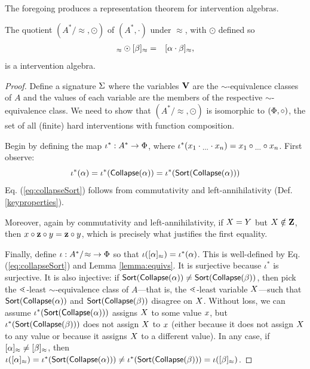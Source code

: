 \documentclass[twoside,11pt]{article}
\begin{document}
The foregoing produces a representation theorem for intervention algebras. 
\begin{theorem}
The quotient $(A^*/\!\approx, \odot)$ of $(A^*,\cdot)$ under $\approx$, 
 with $\odot$ defined so\begin{eqnarray*}
       [\seq]_{\approx} \odot [\seqq]_{\approx} & = & [\seq \cdot \seqq]_\approx,
   \end{eqnarray*} is a intervention algebra. \label{thm:rep}
\end{theorem}
\begin{proof}
Define a signature $\Sigma$ where the variables $\mathbf{V}$ are the $\sim$-equivalence classes of $A$ and the values of each variable are the members of the respective $\sim$-equivalence class. We need to show that $(A^*/\!\approx, \odot)$ is isomorphic to $(\Phi,\circ)$, the set of all (finite) hard interventions with function composition.

Begin by defining the map $\iota^*:A^* \rightarrow \Phi$, where $\iota^* (x_1\cdot {{ }_{\dots}} \cdot x_n) = x_1 \circ {{ }_{\dots}} \circ x_n$. First observe: 
\begin{equation}
    \label{eq:collapseSort}
\iota^*(\alpha) = \iota^*(\mathsf{Collapse}(\alpha)) = \iota^*(\mathsf{Sort}(\mathsf{Collapse}(\alpha)))
\end{equation} Eq. (\ref{eq:collapseSort}) follows from commutativity and left-annihilativity (Def. \ref{keyproperties}).

Moreover, again by commutativity and left-annihilativity, if $X=Y$ but $X \notin \mathbf{Z}$, then $x \circ \mathbf{z} \circ y = \mathbf{z} \circ y$, which is precisely what justifies the first equality. 

Finally, define $\iota:A^*/\! \approx\; \to \Phi$ so that $\iota([\alpha]_{\approx}) = \iota^*(\alpha)$. This is well-defined by Eq. (\ref{eq:collapseSort}) and Lemma \ref{lemma:equivs}. It is surjective because $\iota^*$ is surjective. It is also injective: if $\mathsf{Sort}(\mathsf{Collapse}(\alpha)) \neq \mathsf{Sort}(\mathsf{Collapse}(\beta))$, then pick the $\lessdot$-least $\sim$-equivalence class of $A$---that is, the $\lessdot$-least variable $X$---such that $\mathsf{Sort}(\mathsf{Collapse}(\alpha))$ and $\mathsf{Sort}(\mathsf{Collapse}(\beta))$ disagree on $X$. Without loss, we can assume $\iota^*(\mathsf{Sort}(\mathsf{Collapse}(\alpha)))$ assigns $X$ to some value $x$, but  $\iota^*(\mathsf{Sort}(\mathsf{Collapse}(\beta)))$ does not assign $X$ to $x$ (either because it does not assign $X$ to any value or because it assigns $X$ to a different value). In any case, if $[\alpha]_{\approx} \neq [\beta]_{\approx}$, then $\iota([\alpha]_{\approx}) = \iota^*(\mathsf{Sort}(\mathsf{Collapse}(\alpha)))\neq  \iota^*(\mathsf{Sort}(\mathsf{Collapse}(\beta))) = \iota([\beta]_{\approx})$. 



\end{proof}
\end{document}
